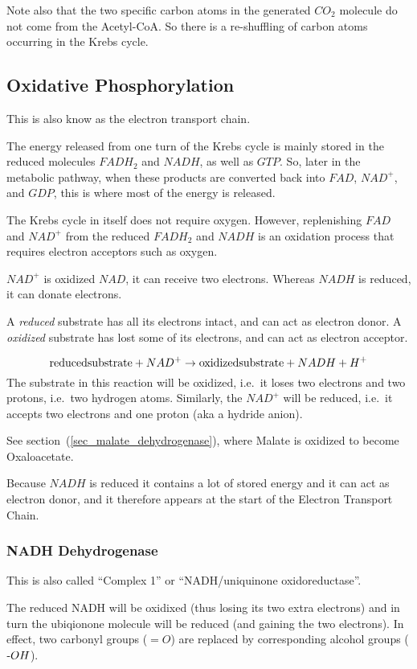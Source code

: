\documentclass{article}
\def\mhyphen{{\hbox{-}}}
\begin{document}
Note also that the two specific carbon atoms in the generated $CO_2$ molecule do not come
from the Acetyl-CoA. So there is a re-shuffling of carbon atoms occurring in the Krebs
cycle.

\subsection{Oxidative Phosphorylation}
This is also know as the electron transport chain.

The energy released from one turn of the Krebs cycle is mainly stored in the reduced
molecules $FADH_2$ and $NADH$, as well as $GTP$. So, later in the metabolic pathway, when
these products are converted back into $FAD$, $NAD^+$, and $GDP$, this is where most of
the energy is released.

The Krebs cycle in itself does not require oxygen. However, replenishing $FAD$ and $NAD^+$
from the reduced $FADH_2$ and $NADH$ is an oxidation process that requires electron
acceptors such as oxygen.

$NAD^+$ is oxidized $NAD$, it can receive two electrons.
Whereas $NADH$ is reduced, it can donate electrons.

A {\em reduced\/} substrate has all its electrons intact, and can act as electron donor.
A {\em oxidized\/} substrate has lost some of its electrons, and can act as electron
acceptor.

\[
    {\rm reduced substrate} + NAD^+ \rightarrow {\rm oxidized substrate} + NADH + H^+
\]
The substrate in this reaction will be oxidized, i.e.\ it loses two electrons and two
protons, i.e.\ two hydrogen atoms. Similarly, the $NAD^+$ will be reduced, i.e.\ it
accepts two electrons and one proton (aka a hydride anion).

See section~(\ref{sec_malate_dehydrogenase}), where Malate is oxidized to become
Oxaloacetate.

Because $NADH$ is reduced it contains a lot of stored energy and it can act as electron
donor, and it therefore appears at the start of the Electron Transport Chain.

\subsubsection{NADH Dehydrogenase}
This is also called ``Complex 1'' or ``NADH/uniquinone oxidoreductase''.

The reduced NADH will be oxidixed (thus losing its two extra electrons) and in turn
the ubiqionone molecule will be reduced (and gaining the two electrons).
In effect, two carbonyl groups ($=O$) are replaced by corresponding alcohol groups
(${\mhyphen}OH$).
\end{document}
